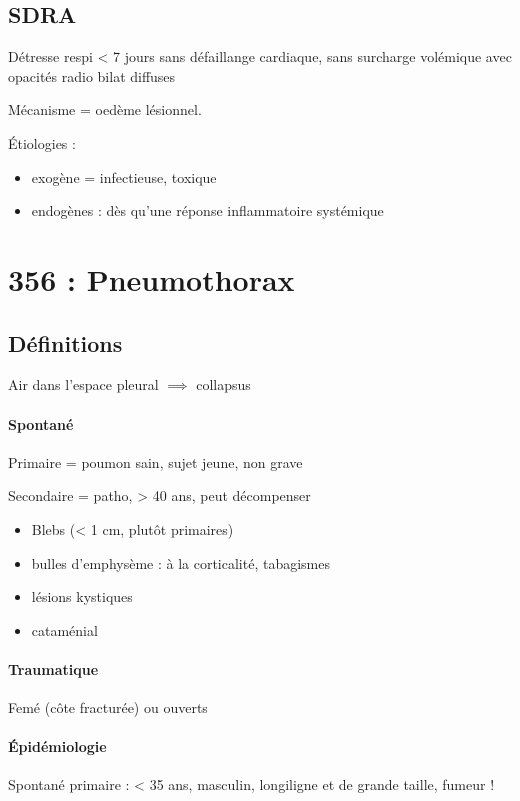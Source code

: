 \documentclass{article}
\begin{document}
\subsection{SDRA}
Détresse respi < 7 jours sans défaillange cardiaque, sans surcharge volémique
avec opacités radio bilat diffuses

Mécanisme = oedème lésionnel.

Étiologies :
\begin{itemize}
\item exogène = infectieuse, toxique
\item endogènes : dès qu'une réponse inflammatoire systémique
\end{itemize}

\section{356 : Pneumothorax}%

\subsection{Définitions}
Air dans l'espace pleural $\implies$ collapsus 

\paragraph{Spontané}
Primaire = poumon sain, sujet jeune, non grave

Secondaire = patho, > 40 ans, peut décompenser

\begin{itemize}
\item Blebs (< 1 cm, plutôt primaires)
\item bulles d'emphysème : à la corticalité, tabagismes
\item lésions kystiques
\item cataménial
\end{itemize}

\paragraph{Traumatique}
Femé (côte fracturée) ou ouverts

\paragraph{Épidémiologie}
Spontané primaire : < 35 ans, masculin, longiligne et de grande taille, fumeur !
\end{document}
